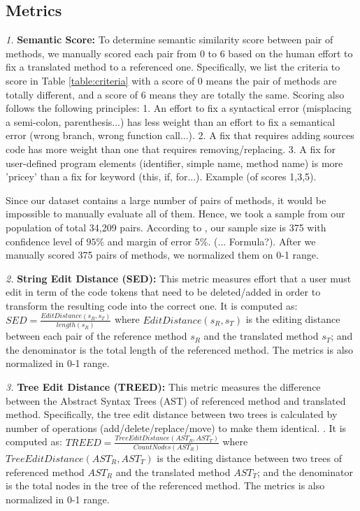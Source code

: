 \subsection{Metrics}

\emph{1.} \textbf{Semantic Score:} To determine semantic similarity score between pair of methods, we manually scored each pair from 0 to 6 based on the human effort to fix a translated method to a referenced one. Specifically, we list the criteria to score in Table \ref{table:criteria} with a score of 0 means the pair of methods are totally different, and a score of 6 means they are totally the same. Scoring also follows the following principles: 1. An effort to fix a syntactical error (misplacing a semi-colon, parenthesis...) has less weight than an effort to fix a semantical error (wrong branch, wrong function call...). 2. A fix that requires adding sources code has more weight than one that requires removing/replacing. 3. A fix for user-defined program elements (identifier, simple name, method name) is more 'pricey' than a fix for keyword (this, if, for...). Example (of scores 1,3,5). 

Since our dataset contains a large number of pairs of methods, it would be impossible to manually evaluate all of them. Hence, we took a sample from our population of total 34,209 pairs. According to \cite{website}, our sample size is 375 with confidence level of $95\%$ and margin of error $5\%$. 
(... Formula?). After we manually scored 375 pairs of methods, we normalized them on 0-1 range.

\emph{2.} \textbf{String Edit Distance (SED):} This metric measures
effort that a user must edit in term of the code tokens
that need to be deleted/added in order to transform the
resulting code into the correct one. It is computed as:  $SED = \frac{EditDistance\left(s_R, s_T\right)}{length\left(s_R\right)}$ where $EditDistance\left(s_R, s_T\right)$ is the editing distance between each pair of the reference method $s_R$ and the translated method $s_T$; and the denominator is the total length of the referenced method. The metrics is also normalized in 0-1 range.

\emph{3.} \textbf{Tree Edit Distance (TREED):} This metric measures the difference between the Abstract Syntax Trees (AST) of referenced method and translated method. Specifically, the tree edit distance between two trees is calculated by number of operations (add/delete/replace/move) to make them identical. \cite{algorithm}. 
It is computed as:  $TREED = \frac{TreeEditDistance\left(AST_R, AST_T\right)}{CountNodes \left(AST_R\right)}$ where $TreeEditDistance\left(AST_R, AST_T\right)$ is the editing distance between two trees of referenced method $AST_R$ and the translated method $AST_T$; and the denominator is the total nodes in the tree of the referenced method.  The metrics is also normalized in 0-1 range.

